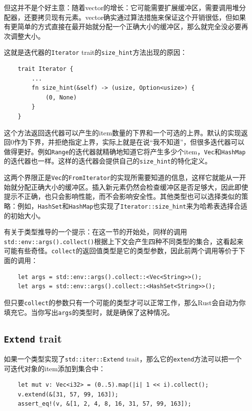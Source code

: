 但这并不是个好主意：随着vector的增长：它可能需要扩展缓冲区，需要调用堆分配器，还要拷贝现有元素。vector确实通过算法措施来保证这个开销很低，但如果有更简单的方式直接在最开始就分配一个正确大小的缓冲区，那么就完全没必要再次调整大小。

这就是迭代器的\texttt{Iterator} trait的\texttt{size\_hint}方法出现的原因：
\begin{verbatim}
    trait Iterator {
        ...
        fn size_hint(&self) -> (usize, Option<usize>) {
            (0, None)
        }
    }
\end{verbatim}

这个方法返回迭代器可以产生的item数量的下界和一个可选的上界。默认的实现返回0作为下界，并拒绝指定上界，实际上就是在说“我不知道”，但很多迭代器可以做得更好。例如\texttt{Range}的迭代器就精确地知道它将产生多少个item，\texttt{Vec}和\texttt{HashMap}的迭代器也一样。这样的迭代器会提供自己的\texttt{size\_hint}的特化定义。

这两个界限正是\texttt{Vec}的\texttt{FromIterator}的实现所需要知道的信息，这样它就能从一开始就分配正确大小的缓冲区。插入新元素仍然会检查缓冲区是否足够大，因此即使提示不正确，也只会影响性能，而不会影响安全性。其他类型也可以选择类似的策略：例如，\texttt{HashSet}和\texttt{HashMap}也实现了\texttt{Iterator::size\_hint}来为哈希表选择合适的初始大小。

有关于类型推导的一个提示：在这一节的开始处，同样的调用\texttt{std::env::args().collect()}根据上下文会产生四种不同类型的集合，这看起来可能有些奇怪。\texttt{collect}的返回值类型是它的类型参数，因此前两个调用等价于下面的调用：
\begin{verbatim}
    let args = std::env::args().collect::<Vec<String>>();
    let args = std::env::args().collect::<HashSet<String>>();
\end{verbatim}

但只要\texttt{collect}的参数只有一个可能的类型才可以正常工作，那么Rust会自动为你填充它。当你写出\texttt{args}的类型时，就是确保了这种情况。

\subsection{\texttt{Extend} trait}
如果一个类型实现了\texttt{std::iter::Extend} trait，那么它的\texttt{extend}方法可以把一个可迭代对象的item添加到集合中：
\begin{verbatim}
    let mut v: Vec<i32> = (0..5).map(|i| 1 << i).collect();
    v.extend(&[31, 57, 99, 163]);
    assert_eq!(v, &[1, 2, 4, 8, 16, 31, 57, 99, 163]);
\end{verbatim}

